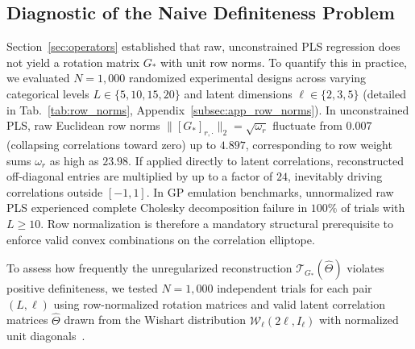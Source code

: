 \documentclass[default,sn-mathphys,Numbered]{sn-jnl}
\theoremstyle{thmstyleone}
\theoremstyle{thmstylethree}
\theoremstyle{thmstyletwo}
\begin{document}
\subsection{Diagnostic of the Naive Definiteness Problem}
\label{subsec:sim_architectural}

Section~\ref{sec:operators} established that raw, unconstrained PLS regression does not yield a rotation matrix $G_*$ with unit row norms. To quantify this in practice, we evaluated $N = 1{,}000$ randomized experimental designs across varying categorical levels $L \in \{5, 10, 15, 20\}$ and latent dimensions $\ell \in \{2, 3, 5\}$ (detailed in Tab.~\ref{tab:row_norms}, Appendix~\ref{subsec:app_row_norms}). In unconstrained PLS, raw Euclidean row norms $\|[G_*]_{r, \cdot}\|_2 = \sqrt{\omega_r}$ fluctuate from $0.007$ (collapsing correlations toward zero) up to $4.897$, corresponding to row weight sums $\omega_r$ as high as $23.98$. If applied directly to latent correlations, reconstructed off-diagonal entries are multiplied by up to a factor of $24$, inevitably driving correlations outside $[-1, 1]$. In GP emulation benchmarks, unnormalized raw PLS experienced complete Cholesky decomposition failure in $100\%$ of trials with $L \ge 10$. Row normalization is therefore a mandatory structural prerequisite to enforce valid convex combinations on the correlation elliptope.


To assess how frequently the unregularized reconstruction $\mathcal{T}_{G_*}(\hat{\Theta})$ violates positive definiteness, we tested $N = 1{,}000$ independent trials for each pair $(L, \ell)$ using row-normalized rotation matrices and valid latent correlation matrices $\hat{\Theta}$ drawn from the Wishart distribution $\mathcal{W}_\ell(2\ell, I_\ell)$ with normalized unit diagonals~\citep{nydick2012wishart}.
\end{document}
